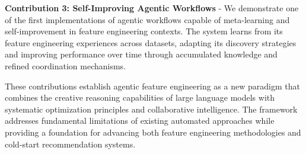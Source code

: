 \textbf{Contribution 3: Self-Improving Agentic Workflows} - We demonstrate one of the first implementations of agentic workflows capable of meta-learning and self-improvement in feature engineering contexts. The system learns from its feature engineering experiences across datasets, adapting its discovery strategies and improving performance over time through accumulated knowledge and refined coordination mechanisms.

These contributions establish agentic feature engineering as a new paradigm that combines the creative reasoning capabilities of large language models with systematic optimization principles and collaborative intelligence. The framework addresses fundamental limitations of existing automated approaches while providing a foundation for advancing both feature engineering methodologies and cold-start recommendation systems.
